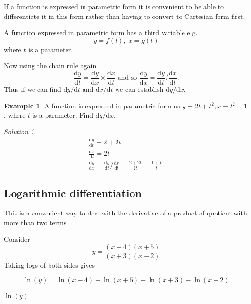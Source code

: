 \documentclass[
  english,
  11pt,
  oneside]{book}
\newcommand{\slide}{}
\theoremstyle{definition}
\theoremstyle{definition}
\newtheorem{example}{Example}[chapter]
\theoremstyle{definition}
\theoremstyle{definition}
\theoremstyle{remark}
\newtheorem*{solution}{Solution}
\begin{document}
If a function is expressed in parametric form it is convenient to be able to differentiate it in this form rather than having to convert to Cartesian form first.

A function expressed in parametric form has a third variable e.g.
\[y = f(t),\; x = g(t)\]
where \(t\) is a parameter.

Now using the chain rule again
\[\frac{\mathrm{d} y}{\mathrm{d} t} = \frac{\mathrm{d} y}{\mathrm{d} x}\times\frac{\mathrm{d} x}{\mathrm{d} t}\text{ and so }\frac{\mathrm{d} y}{\mathrm{d} x} = \frac{\mathrm{d} y}{\mathrm{d} t}/\frac{\mathrm{d} x}{\mathrm{d} t}.\]
Thus if we can find \(\mathrm{d}y/\mathrm{d} t\) and \(\mathrm{d}x/\mathrm{d} t\) we can establish \(\mathrm{d}y/\mathrm{d} x\).

\slide

\begin{example}
A function is expressed in parametric form as \(y = 2t + t^2, x = t^2 - 1\), where \(t\) is a parameter. Find \(\mathrm{d}y/\mathrm{d} x\).
\end{example}

\begin{solution}
\begin{gather*}
\frac{\mathrm{d} y}{\mathrm{d} t} = 2+2t\\
\frac{\mathrm{d} x}{\mathrm{d} t} = 2t\\
\frac{\mathrm{d} y}{\mathrm{d} x} = \frac{\mathrm{d} y}{\mathrm{d} t}/\frac{\mathrm{d} x}{\mathrm{d} t} = \frac{2+2t}{2t} = \frac{1+t}{t}.
\end{gather*}
\end{solution}

\slide

\subsection{Logarithmic differentiation}\label{logarithmic-differentiation}

This is a convenient way to deal with the derivative of a product of quotient with more than two terms.

Consider
\[y = \frac{(x-4)(x+5)}{(x+3)(x-2)}\]
Taking logs of both sides gives

\begin{notslides}

\[\ln(y) = \ln(x-4)+\ln(x+5)-\ln(x+3)-\ln(x-2)\]

\end{notslides}

\begin{slidesonly}

\(\ln(y) =\)

\end{slidesonly}
\end{document}
